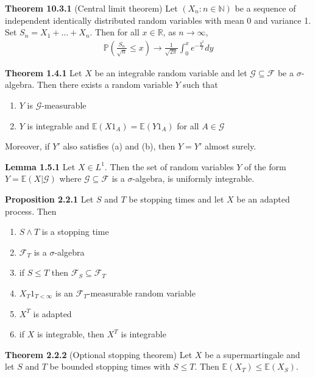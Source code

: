 \documentclass[hidelinks, 12pt]{article}
\theoremstyle{mydefstyle}
\theoremstyle{mythmstyle}
\begin{document}
\textbf{Theorem 10.3.1} (Central limit theorem) Let $(X_n : n \in \mathbb{N})$ be a sequence of independent identically distributed random variables with mean 0 and variance 1. Set $S_n = X_1 + \dots + X_n$. Then for all $x \in \mathbb{R}$, as $n \to \infty$,
\begin{gather*}
\mathbb{P} \left( \frac{S_n}{\sqrt{n}} \le x \right) \to \frac{1}{\sqrt{2\pi}} \int_0^x e^{-\frac{y^2}{2}} dy
\end{gather*}

\textbf{Theorem 1.4.1} Let $X$ be an integrable random variable and let $\mathcal{G} \subseteq \mathcal{F}$ be a $\sigma$-algebra. Then there exists a random variable $Y$ such that
\begin{enumerate}[label = (\alph*)]
\item $Y$ is $\mathcal{G}$-measurable
\item $Y$ is integrable and $\mathbb{E}(X1_A) = \mathbb{E}(Y1_A)$ for all $A \in \mathcal{G}$
\end{enumerate}
Moreover, if $Y'$ also satisfies (a) and (b), then $Y = Y'$ almost surely.

\textbf{Lemma 1.5.1} Let $X \in L^1$. Then the set of random variables $Y$ of the form $Y = \mathbb{E}(X \vert \mathcal{G})$ where $\mathcal{G} \subseteq \mathcal{F}$ is a $\sigma$-algebra, is uniformly integrable. 

\textbf{Proposition 2.2.1} Let $S$ and $T$ be stopping times and let $X$ be an adapted process. Then
\begin{enumerate}[label = (\alph*)]
\item $S \wedge T$ is a stopping time
\item $\mathcal{F}_T$ is a $\sigma$-algebra
\item if $S \le T$ then $\mathcal{F}_S \subseteq \mathcal{F}_T$
\item $X_T 1_{T < \infty}$ is an $\mathcal{F}_T$-measurable random variable
\item $X^T$ is adapted
\item if $X$ is integrable, then $X^T$ is integrable
\end{enumerate}

\textbf{Theorem 2.2.2} (Optional stopping theorem) Let $X$ be a supermartingale and let $S$ and $T$ be bounded stopping times with $S \le T$. Then $\mathbb{E}(X_T) \le \mathbb{E}(X_S)$. 
\end{document}
